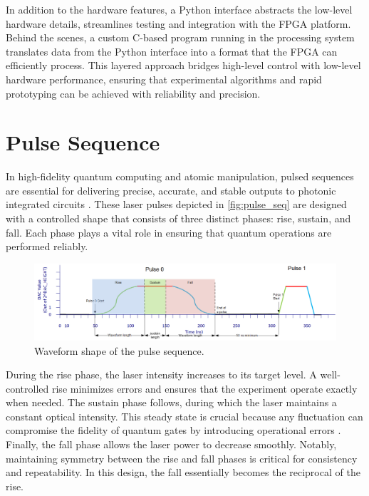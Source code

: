 In addition to the hardware features, a Python interface abstracts the low-level hardware details, streamlines testing and integration with the FPGA platform. Behind the scenes, a custom C-based program running in the processing system translates data from the Python interface into a format that the FPGA can efficiently process. This layered approach bridges high-level control with low-level hardware performance, ensuring that experimental algorithms and rapid prototyping can be achieved with reliability and precision.

\section{Pulse Sequence}

In high-fidelity quantum computing and atomic manipulation, pulsed sequences are essential for delivering precise, accurate, and stable outputs to photonic integrated circuits \cite{apic}. These laser pulses depicted in \autoref{fig:pulse_seq} are designed with a controlled shape that consists of three distinct phases: rise, sustain, and fall. Each phase plays a vital role in ensuring that quantum operations are performed reliably.

\begin{figure}[h]
    \centering
    \includegraphics[width=1\linewidth]{figures/2.1.png}
    \caption{Waveform shape of the pulse sequence.}
    \label{fig:pulse_seq}
\end{figure}

During the rise phase, the laser intensity increases to its target level. A well-controlled rise minimizes errors and ensures that the experiment operate exactly when needed. The sustain phase follows, during which the laser maintains a constant optical intensity. This steady state is crucial because any fluctuation can compromise the fidelity of quantum gates by introducing operational errors \cite{naturequantuminfo}. Finally, the fall phase allows the laser power to decrease smoothly. Notably, maintaining symmetry between the rise and fall phases is critical for consistency and repeatability. In this design, the fall essentially becomes the reciprocal of the rise.


